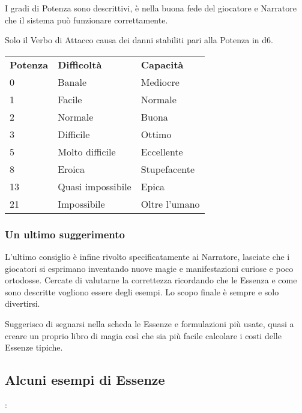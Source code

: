 \documentclass[a4paper,twoside,openany]{book}
\begin{document}
\begin{multicols}{2}
I gradi di Potenza sono descrittivi, è nella buona fede del giocatore e Narratore che il sistema può funzionare correttamente.

Solo il Verbo di Attacco causa dei danni stabiliti pari alla Potenza in d6.

\medskip

\begin{tabularx}{0.45\textwidth}{lll}
	\toprule
\textbf{Potenza}	&	\textbf{Difficoltà} & \textbf{Capacità}\\

0       & Banale	        & Mediocre	\\
1       & Facile    	    & Normale	\\
2       & Normale       	& Buona		\\
3       & Difficile        	& Ottimo	\\
5       & Molto difficile  	& Eccellente	\\
8       & Eroica    	   	& Stupefacente	\\
13      & Quasi impossibile & Epica	\\
21      & Impossibile     	& Oltre l'umano	\\
\end{tabularx}


\subsubsection{Un ultimo suggerimento}

L'ultimo consiglio è infine rivolto specificatamente ai Narratore, lasciate che i giocatori si esprimano inventando nuove magie e manifestazioni curiose e poco ortodosse. Cercate di valutarne la correttezza ricordando che le Essenza e come sono descritte vogliono essere degli esempi. Lo scopo finale è sempre e solo divertirsi.


\bigskip

Suggerisco di segnarsi nella scheda le Essenze e formulazioni più usate, quasi a creare un proprio libro di magia così che sia più facile calcolare i costi delle Essenze tipiche.



\pagebreak
\end{multicols}

\subsection{Alcuni esempi di Essenze}:\\
\end{document}
